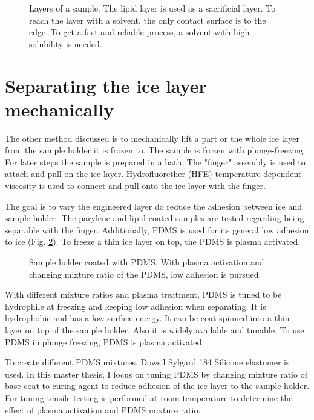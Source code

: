 \begin{figure}[hbt!]
	\centering
	
	\caption{Layers of a sample. The lipid layer is used as a sacrificial layer. To reach the layer with a solvent, the only contact surface is to the edge. To get a fast and reliable process, a solvent with high solubility is needed.}
	\label{fig:sacrificial layer}
\end{figure}

\section{Separating the ice layer mechanically}

The other method discussed is to mechanically lift a part or the whole ice layer from the sample holder it is frozen to. The sample is frozen with plunge-freezing. For later steps the sample is prepared in a bath. The "finger" assembly is used to attach and pull on the ice layer. Hydrofluorether (HFE) temperature dependent viscosity is used to connect and pull onto the ice layer with the finger.

The goal is to vary the engineered layer do reduce the adhesion between ice and sample holder. The parylene and lipid coated samples are tested regarding being separable with the finger. Additionally, PDMS is used for its general low adhesion to ice (Fig. \ref{fig:PDMS layer}). To freeze a thin ice layer on top, the PDMS is plasma activated.

\begin{figure}[hbt!]
	\centering
	
	\caption{Sample holder coated with PDMS. With plasma activation and changing mixture ratio of the PDMS, low adhesion is pursued.}
	\label{fig:PDMS layer}
\end{figure}
 

With different mixture ratios and plasma treatment, PDMS is tuned to be hydrophile at freezing and keeping low adhesion when separating. It is hydrophobic and has a low surface energy. It can be coat spinned into a thin layer on top of the sample holder. Also it is widely available and tunable. To use PDMS in plunge freezing, PDMS is plasma activated.

To create different PDMS mixtures, Dowsil Sylgard 184 Silicone elastomer is used\cite{DOW.}. In this master thesis, I focus on tuning PDMS by changing mixture ratio of base coat to curing agent to reduce adhesion of the ice layer to the sample holder. For tuning tensile testing is performed at room temperature to determine the effect of plasma activation and PDMS mixture ratio.

